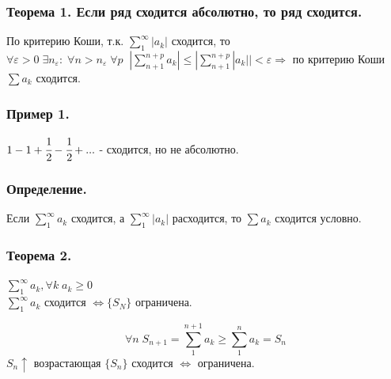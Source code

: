 \documentclass[12pt, a4paper]{article}
\newcommand{\eps}{\varepsilon}
\begin{document}
\subsubsection{\textbf{Теорема 1. Если ряд сходится абсолютно, то ряд сходится.}}
\begin{tcolorbox}[title=Доказательство (Критерий Коши)]
    По критерию Коши, т.к. $\sum^\infty_{1} |a_k|$ сходится, то $\forall \eps > 0\; \exists n_\eps:\; \forall n > n_\eps\; \forall p\;\; |\sum^{n+p}_{n+1} a_k| \leq |\sum^{n+p}_{n+1} |a_k|| < \eps \Rightarrow$ по критерию Коши $\sum a_k$ сходится.
\end{tcolorbox}
\subsubsection*{\textbf{Пример 1.}}
$1 - 1 + \cfrac{1}{2} - \cfrac{1}{2} + ... $ - сходится, но не абсолютно.
\subsubsection{\textbf{Определение.}} 
Если $\sum^{\infty}_{1} a_k$ сходится, а $\sum^{\infty}_{1} |a_k|$ расходится, то $\sum a_k$ сходится условно.
\subsubsection{\textbf{Теорема 2.}}
$\sum^{\infty}_{1} a_k, \forall k\; a_k \geq 0$\\
$\sum^{\infty}_{1} a_k$ сходится $\Leftrightarrow \{S_N\}$ ограничена.
\begin{tcolorbox}[title=Доказательство]
    \[\forall n\; S_{n+1} = \sum^{n+1}_{1} a_k \geq \sum^{n}_{1} a_k = S_n \]
    $S_n \uparrow$ возрастающая $\{S_n\}$ сходится $\Leftrightarrow$ ограничена.
\end{tcolorbox}
\end{document}
